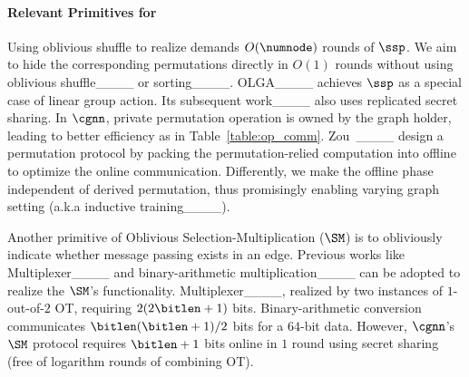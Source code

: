 \paragraph{Relevant Primitives for \osmm}
Using oblivious shuffle to realize \osmm demands $O(\numnode)$ rounds of $\ssp$.
We aim to hide the corresponding permutations directly in $O(1)$ rounds 
without using oblivious shuffle____ or sorting____.
OLGA____ achieves $\ssp$ as a special case of linear group action.
Its subsequent work____ also uses 
replicated secret sharing.
In $\cgnn$, private permutation operation is owned by the graph holder, leading to better efficiency as in Table~\ref{table:op_comm}.
Zou~\etal ____ design a permutation protocol by packing the permutation-relied computation into offline to optimize the online communication.
Differently, we make the offline phase independent of derived permutation, thus promisingly enabling varying graph setting (a.k.a inductive training____).

Another primitive of Oblivious Selection-Multiplication ($\SM$) is to obliviously indicate whether message passing exists in an edge.
Previous works like Multiplexer____ and binary-arithmetic multiplication____ can be adopted to realize the $\SM$'s functionality.
Multiplexer____, realized by two instances of $1$-out-of-$2$ OT, requiring $2(2\bitlen + 1)$ bits.
Binary-arithmetic conversion communicates $\bitlen(\bitlen+1)/2$ bits for a $64$-bit data. 
However, $\cgnn$'s $\SM$ protocol requires $\bitlen+1$ bits online in $1$ round using secret sharing (free of logarithm rounds of combining OT).


